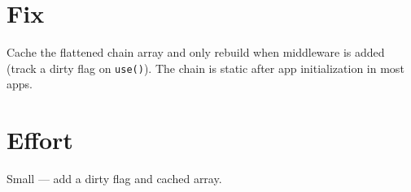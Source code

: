 \section{Fix}\label{record-397-fix}

Cache the flattened chain array and only rebuild when middleware is added (track a dirty flag on \texttt{u\allowbreak{}s\allowbreak{}e\allowbreak{}(\allowbreak{})}). The chain is static after app initialization in most apps.

\section{Effort}\label{record-397-effort}

Small --- add a dirty flag and cached array.

